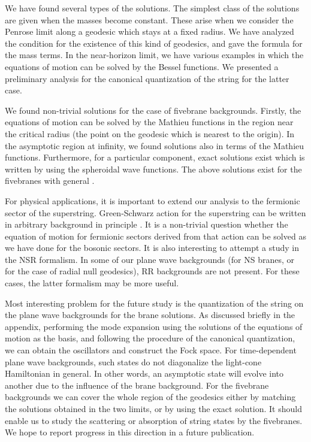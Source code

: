 \documentclass[a4paper,12pt]{article}
\begin{document}
We have found several types of the solutions. 
The simplest class of the solutions are given when
the masses become constant. These arise 
when we consider the Penrose limit along a geodesic 
which stays at a fixed radius. We have analyzed the 
condition for the existence of this kind of geodesics,
and gave the formula for the mass terms.
In the near-horizon limit, we have various examples
in which the equations of motion can be solved 
by the Bessel functions. We presented a preliminary
analysis for the canonical quantization of the string
for the latter case.

We found non-trivial solutions for the case
of fivebrane backgrounds. Firstly, 
the equations of motion can be solved by the 
Mathieu functions in the region near the 
critical radius (the point on the geodesic 
which is nearest to the origin). 
In the asymptotic region at infinity,
we found solutions also in terms of the Mathieu
functions. Furthermore, for a particular component,
exact solutions exist which is written by using
the spheroidal wave functions. The above solutions
exist for the fivebranes with general \coordHE{}.

For physical applications, it is important to extend
our analysis to the fermionic sector of the superstring.
Green-Schwarz action for the superstring can be written in 
arbitrary background in principle \cite{Gr}.
It is a non-trivial question whether the equation of
motion for fermionic sectors derived from that action
can be solved as we have done for the bosonic sectors.
It is also interesting to attempt a study in the NSR
formalism. In some of our plane wave backgrounds (for NS branes,
or for the case of radial null geodesics), RR backgrounds
are not present. For these cases, the latter formalism
may be more useful.

Most interesting problem for the future study is the 
quantization of the string on the plane wave backgrounds
for the brane solutions. As discussed briefly in the appendix,
performing the mode expansion using the solutions of 
the equations of motion as the  basis, and following 
the procedure of the canonical quantization,
we can obtain the oscillators and construct the Fock space. 
For time-dependent plane wave backgrounds, such states 
do not diagonalize the light-cone Hamiltonian in general. 
In other words, an asymptotic state will evolve into another due
to the influence of the brane background.
For the fivebrane backgrounds we can cover
the whole region of the geodesics either by matching the
solutions obtained in the two limits, or by using 
the exact solution. It should enable us to study the 
scattering or absorption of string states by the fivebranes.
We hope to report progress in this direction
in a future publication.
\end{document}
